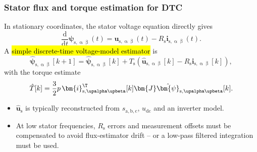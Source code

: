 \begin{frame}
    \frametitle{Stator flux and torque estimation for DTC}
    In stationary coordinates, the stator voltage equation directly gives
    \begin{equation}
        \frac{\mathrm{d}}{\mathrm{d}t}\bm{\psi}_{\mathrm{s},\upalpha\upbeta}(t)
        =\bm{u}_{\mathrm{s},\upalpha\upbeta}(t)-R_\mathrm{s}\bm{i}_{\mathrm{s},\upalpha\upbeta}(t).
        \label{eq:IM_DTC_stator_flux_voltage_model_ct_v2}
    \end{equation}\pause%
    A \hl{simple discrete-time voltage-model estimator} is
    \begin{equation}
        \hat{\bm{\psi}}_{\mathrm{s},\upalpha\upbeta}[k+1]
        =\hat{\bm{\psi}}_{\mathrm{s},\upalpha\upbeta}[k]
        +T_\mathrm{s}\left(\hat{\bm{u}}_{\mathrm{s},\upalpha\upbeta}[k]-R_\mathrm{s}\bm{i}_{\mathrm{s},\upalpha\upbeta}[k]\right),
        \label{eq:IM_DTC_stator_flux_voltage_model_dt_v2}
    \end{equation}\pause%
    with the torque estimate
    \begin{equation}
        \hat{T}[k]
        =\frac{3}{2}p\,\bm{i}_{\mathrm{s},\upalpha\upbeta}^{\T}[k]
        \bm{J}\hat{\bm{\psi}}_{\mathrm{s},\upalpha\upbeta}[k].
        \label{eq:IM_DTC_torque_estimate_v2}
    \end{equation}\pause%
    \begin{itemize}
        \item $\hat{\bm{u}}_\mathrm{s}$ is typically reconstructed from $s_\mathrm{a,b,c}$, $u_\mathrm{dc}$ and an inverter model.\pause%
        \item At low stator frequencies, $R_\mathrm{s}$ errors and measurement offsets must be compensated to avoid flux-estimator drift -- or a low-pass filtered integration must be used.
    \end{itemize}
\end{frame}

